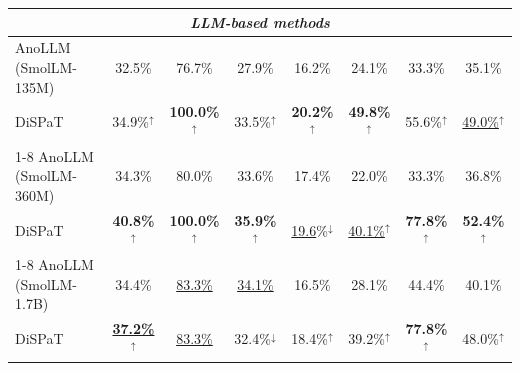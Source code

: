 \begin{table}[t]
\begin{tabular}{l c c c c c c c}
\midrule
\multicolumn{8}{c}{\textit{LLM-based methods}} \\
\midrule
AnoLLM (SmolLM-135M) & 32.5\% & 76.7\% & 27.9\% & 16.2\% & 24.1\% & 33.3\%  & 35.1\% \\
DiSPaT               & 34.9\%$^{\uparrow}$ & \textbf{100.0\%}$^{\uparrow}$ & 33.5\%$^{\uparrow}$ & \textbf{20.2\%}$^{\uparrow}$ & \textbf{49.8\%}$^{\uparrow}$ & 55.6\%$^{\uparrow}$ & \underline{49.0\%}$^{\uparrow}$ \\
\cmidrule{1-8}
AnoLLM (SmolLM-360M) & 34.3\% & 80.0\% & 33.6\% & 17.4\% & 22.0\% & 33.3\%  & 36.8\% \\
DiSPaT               & \textbf{40.8\%}$^{\uparrow}$ & \textbf{100.0\%}$^{\uparrow}$ & \textbf{35.9\%}$^{\uparrow}$ & \underline{19.6}\%$^{\downarrow}$ & \underline{40.1\%}$^{\uparrow}$ & \textbf{77.8\%}$^{\uparrow}$ & \textbf{52.4\%}$^{\uparrow}$ \\
\cmidrule{1-8}
AnoLLM (SmolLM-1.7B) & 34.4\% & \underline{83.3\%} & \underline{34.1\%} & 16.5\% & 28.1\% & 44.4\%  & 40.1\% \\
DiSPaT               & \underline{\textbf{37.2\%}}$^{\uparrow}$ & \underline{83.3\%} & 32.4\%$^{\downarrow}$ & 18.4\%$^{\uparrow}$ & 39.2\%$^{\uparrow}$ & \textbf{77.8\%}$^{\uparrow}$ & 48.0\%$^{\uparrow}$ \\
\bottomrule
\end{tabular}
\end{table}



